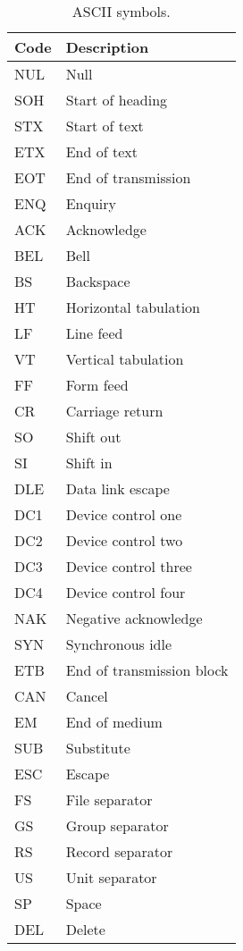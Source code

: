 \begin{table}
  \centering
  \begin{tabular}{|l|l|}
    \hline
    Code & Description\\
    \hline
    NUL & Null\\
    SOH & Start of heading\\
    STX & Start of text\\
    ETX & End of text\\
    EOT & End of transmission\\
    ENQ & Enquiry\\
    ACK & Acknowledge\\
    BEL & Bell\\
    BS & Backspace\\
    HT & Horizontal tabulation\\
    LF & Line feed\\
    VT & Vertical tabulation\\
    FF & Form feed\\
    CR & Carriage return\\
    SO & Shift out\\
    SI & Shift in\\
    DLE & Data link escape\\
    DC1 & Device control one\\
    DC2 & Device control two\\
    DC3 & Device control three\\
    DC4 & Device control four\\
    NAK & Negative acknowledge\\
    SYN & Synchronous idle\\
    ETB & End of transmission block\\
    CAN & Cancel\\
    EM & End of medium\\
    SUB & Substitute\\
    ESC & Escape\\
    FS & File separator\\
    GS & Group separator\\
    RS & Record separator\\
    US & Unit separator\\
    SP & Space\\
    DEL & Delete\\
    \hline
  \end{tabular}
  \caption{ASCII symbols.}
  \label{tab:asciiSpecialSymbols}
\end{table}

